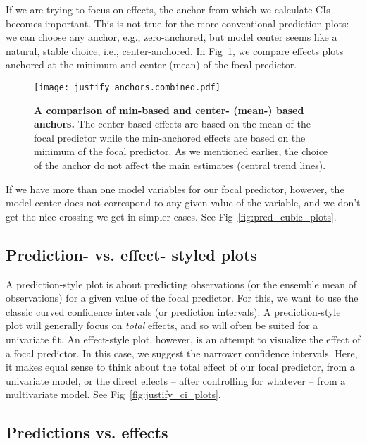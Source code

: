 If we are trying to focus on effects, the anchor from which we calculate CIs becomes important. This is not true for the more conventional prediction plots: we can choose any anchor, e.g., zero-anchored, but model center seems like a natural, stable choice, i.e., center-anchored. In Fig~\ref{fig:justify_anchors}, we compare effects plots anchored at the minimum and center (mean) of the focal predictor.

\begin{figure}[h]
\begin{center}
\texttt{[image: justify\_anchors.combined.pdf]}
\end{center}
\caption{{\bf A comparison of min-based and center- (mean-) based anchors.} The center-based effects are based on the mean of the focal predictor while the min-anchored effects are based on the minimum of the focal predictor. As we mentioned earlier, the choice of the anchor do not affect the main estimates (central trend lines).} 
\label{fig:justify_anchors}
\end{figure}

If we have more than one model variables for our focal predictor, however, the model center does not correspond to any given value of the variable, and we don't get the nice crossing we get in simpler cases. See Fig~\ref{fig:pred_cubic_plots}.


\subsection{Prediction- vs. effect- styled plots}

A prediction-style plot is about predicting observations (or the ensemble mean of observations) for a given value of the focal predictor. For this, we want to use the classic curved confidence intervals (or prediction intervals). A prediction-style plot will generally focus on \emph{total} effects, and so will often be suited for a univariate fit. An effect-style plot, however, is an attempt to visualize the effect of a focal predictor. In this case, we suggest the narrower confidence intervals. Here, it makes equal sense to think about the total effect of our focal predictor, from a univariate model, or the direct effects – after controlling for whatever – from a multivariate model. See Fig~\ref{fig:justify_ci_plots}.

\subsection{Predictions vs. effects}

